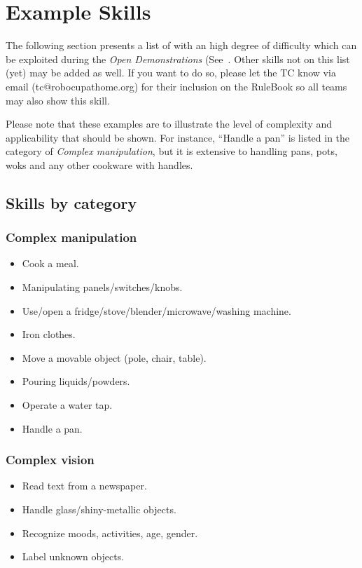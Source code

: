 \chapter{Example Skills}
\label{chap:example-skills}

The following section presents a list of  with an high degree of difficulty which can be exploited during the \textit{Open Demonstrations} (See~.
Other skills not on this list (yet) may be added as well. If you want to do so, please let the TC know via email (tc@robocupathome.org) for their inclusion on the RuleBook so all teams may also show this skill.

Please note that these examples are to illustrate the level of complexity and applicability that should be shown. For instance, \enquote{Handle a pan} is listed in the category of \textit{Complex manipulation}, but it is extensive to handling pans, pots, woks and any other cookware with handles.

\section{Skills by category}

\subsection{Complex manipulation}
\begin{itemize}
	\item Cook a meal.
	\item Manipulating panels/switches/knobs.
	\item Use/open a fridge/stove/blender/microwave/washing machine.
	\item Iron clothes.
	\item Move a movable object (pole, chair, table).
	\item Pouring liquids/powders.
	\item Operate a water tap.
	\item Handle a pan.
\end{itemize}

\subsection{Complex vision}
\begin{itemize}
	\item Read text from a newspaper.
	\item Handle glass/shiny-metallic objects.
	\item Recognize moods, activities, age, gender.
	\item Label unknown objects.
\end{itemize}

